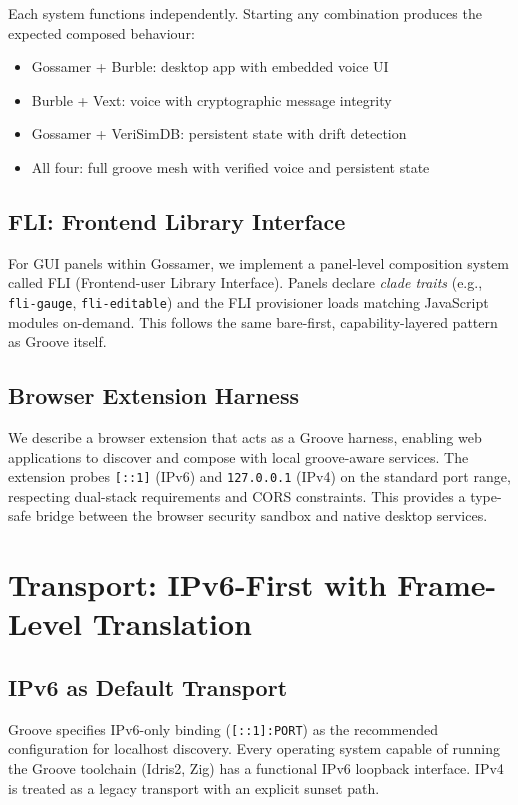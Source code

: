 \documentclass[11pt,a4paper]{article}
\begin{document}
Each system functions independently. Starting any combination produces
the expected composed behaviour:

\begin{itemize}
\item Gossamer + Burble: desktop app with embedded voice UI
\item Burble + Vext: voice with cryptographic message integrity
\item Gossamer + VeriSimDB: persistent state with drift detection
\item All four: full groove mesh with verified voice and persistent state
\end{itemize}

\subsection{FLI: Frontend Library Interface}

For GUI panels within Gossamer, we implement a panel-level composition
system called FLI (Frontend-user Library Interface). Panels declare
\emph{clade traits} (e.g., \texttt{fli-gauge}, \texttt{fli-editable})
and the FLI provisioner loads matching JavaScript modules on-demand. This
follows the same bare-first, capability-layered pattern as Groove itself.

\subsection{Browser Extension Harness}

We describe a browser extension that acts as a Groove harness, enabling
web applications to discover and compose with local groove-aware services.
The extension probes \texttt{[::1]} (IPv6) and \texttt{127.0.0.1} (IPv4)
on the standard port range, respecting dual-stack requirements and CORS
constraints. This provides a type-safe bridge between the browser security
sandbox and native desktop services.

\section{Transport: IPv6-First with Frame-Level Translation}
\label{sec:transport}

\subsection{IPv6 as Default Transport}

Groove specifies IPv6-only binding (\texttt{[::1]:PORT}) as the recommended
configuration for localhost discovery. Every operating system capable of
running the Groove toolchain (Idris2, Zig) has a functional IPv6 loopback
interface. IPv4 is treated as a legacy transport with an explicit sunset
path.
\end{document}
